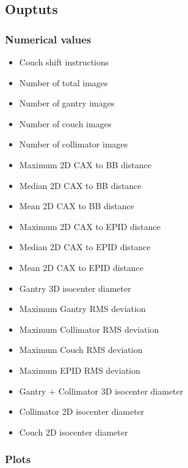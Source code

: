 \subsection{Ouptuts}

\subsubsection{Numerical values} \label{sec:wlTestNumericalOutput}

\begin{multicols}{2}
\begin{itemize}

    \item Couch shift instructions
    \item Number of total images
    \item Number of gantry images
    \item Number of couch images
    \item Number of collimator images
    \item Maximum 2D CAX to BB distance
    \item Median 2D CAX to BB distance
    \item Mean 2D CAX to BB distance
    \item Maximum 2D CAX to EPID distance
    \item Median 2D CAX to EPID distance
    \item Mean 2D CAX to EPID distance
    \item Gantry 3D isocenter diameter
    \item Maximum Gantry RMS deviation
    \item Maximum Collimator RMS deviation
    \item Maximum Couch RMS deviation
    \item Maximum EPID RMS deviation
    \item Gantry + Collimator 3D isocenter diameter
    \item Collimator 2D isocenter diameter
    \item Couch 2D isocenter diameter
    
\end{itemize}
\end{multicols}

\pagebreak

\subsubsection{Plots}

